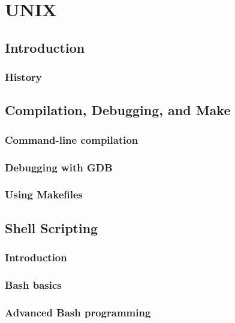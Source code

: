 \documentclass[11pt,twoside]{book}
\begin{document}
\part{UNIX}

\chapter{Introduction}

\section{History}



\chapter{Compilation, Debugging, and Make}

\section{Command-line compilation}

\section{Debugging with GDB}

\section{Using Makefiles}



\chapter{Shell Scripting}

\section{Introduction}

\section{Bash basics}

\section{Advanced Bash programming}
\end{document}
